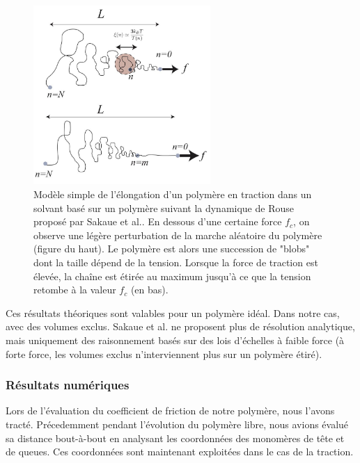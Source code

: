 \documentclass[a4paper,11pt]{article}
\begin{document}
\begin{figure}[H]
\begin{center}
\includegraphics[width=0.6\textwidth]{sakauetraction.jpg}
\caption{Modèle simple de l'élongation d'un polymère en traction dans un solvant basé sur un polymère suivant la dynamique de Rouse proposé par Sakaue et al.\cite{Sakaue2012}. En dessous d'une certaine force $f_c$, on observe une légère perturbation de la marche aléatoire du polymère (figure du haut). Le polymère est alors une succession de "blobs" dont la taille dépend de la tension. Lorsque la force de traction est élevée, la chaîne est étirée au maximum jusqu'à ce que la tension retombe à la valeur $f_c$ (en bas).}
\label{sakauetraction}
\end{center}
\end{figure}

Ces résultats théoriques sont valables pour un polymère idéal. Dans notre cas, avec des volumes exclus. Sakaue et al. \cite{Sakaue2012} ne proposent plus de résolution analytique, mais uniquement des raisonnement basés sur des lois d'échelles à faible force (à forte force, les volumes exclus n'interviennent plus sur un polymère étiré).

\subsubsection*{Résultats numériques}

Lors de l'évaluation du coefficient de friction de notre polymère, nous l'avons tracté. Précedemment pendant l'évolution du polymère libre, nous avions évalué sa distance bout-à-bout en analysant les coordonnées des monomères de tête et de queues. Ces coordonnées sont maintenant exploitées dans le cas de la traction. 
\end{document}
